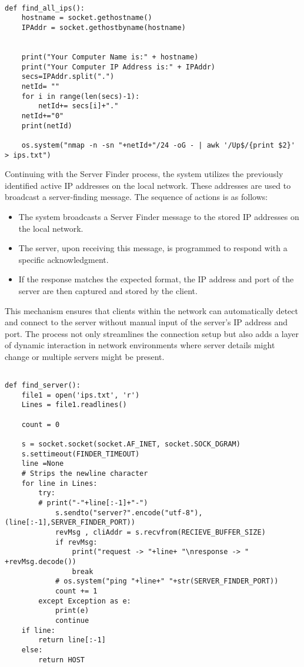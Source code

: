 \begin{lstlisting}[style=pythonstyle]

def find_all_ips():
    hostname = socket.gethostname()
    IPAddr = socket.gethostbyname(hostname)


    print("Your Computer Name is:" + hostname)
    print("Your Computer IP Address is:" + IPAddr)
    secs=IPAddr.split(".")
    netId= ""
    for i in range(len(secs)-1):
        netId+= secs[i]+"."
    netId+="0"
    print(netId)

    os.system("nmap -n -sn "+netId+"/24 -oG - | awk '/Up$/{print $2}' > ips.txt")
\end{lstlisting}

Continuing with the Server Finder process, the system utilizes the previously identified active IP addresses on the local network. These addresses are used to broadcast a server-finding message. The sequence of actions is as follows:

\begin{itemize}
    \item The system broadcasts a Server Finder message to the stored IP addresses on the local network.
    \item The server, upon receiving this message, is programmed to respond with a specific acknowledgment.
    \item If the response matches the expected format, the IP address and port of the server are then captured and stored by the client.
\end{itemize}

This mechanism ensures that clients within the network can automatically detect and connect to the server without manual input of the server's IP address and port. The process not only streamlines the connection setup but also adds a layer of dynamic interaction in network environments where server details might change or multiple servers might be present.

\begin{lstlisting}[style=pythonstyle]

def find_server():
    file1 = open('ips.txt', 'r')
    Lines = file1.readlines()

    count = 0

    s = socket.socket(socket.AF_INET, socket.SOCK_DGRAM)
    s.settimeout(FINDER_TIMEOUT)
    line =None
    # Strips the newline character
    for line in Lines:
        try:
        # print("-"+line[:-1]+"-")
            s.sendto("server?".encode("utf-8"), (line[:-1],SERVER_FINDER_PORT))
            revMsg , cliAddr = s.recvfrom(RECIEVE_BUFFER_SIZE)
            if revMsg:
                print("request -> "+line+ "\nresponse -> " +revMsg.decode())
                break
            # os.system("ping "+line+" "+str(SERVER_FINDER_PORT))
            count += 1
        except Exception as e:
            print(e)
            continue
    if line:
        return line[:-1]
    else:
        return HOST
\end{lstlisting}


